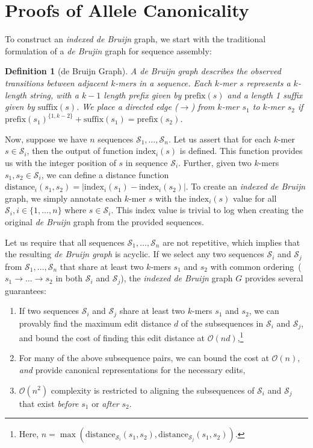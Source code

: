 \documentclass[masters]{ucbthesis}
\newtheorem{defn}{Definition}
\begin{document}
\section{Proofs of Allele Canonicality}
\label{sec:canonical-proofs}

To construct an \emph{indexed de Bruijn} graph, we start with the traditional formulation of a \emph{de
Brujin} graph for sequence assembly:

\begin{defn}[de Bruijn Graph]
\label{defn:dbg}
A de Bruijn graph describes the observed transitions between adjacent $k$-mers in a sequence. Each
$k$-mer $s$ represents a $k$-length string, with a $k - 1$ length prefix given by $\text{prefix}(s)$ and a
length 1 suffix given by $\text{suffix}(s)$. We place a directed edge ($\rightarrow$) from $k$-mer $s_1$ to
$k$-mer $s_2$ if $\text{prefix}(s_1)^{\{1, k - 2\}} + \text{suffix}(s_1) = \text{prefix}(s_2)$.
\end{defn}

Now, suppose we have $n$ sequences $\mathcal{S}_1, \dots, \mathcal{S}_n$. Let us assert that for each
$k$-mer $s \in \mathcal{S}_i$, then the output of function $\text{index}_i(s)$ is defined. This function
provides us with the integer position of $s$ in sequence $\mathcal{S}_i$. Further, given two $k$-mers
$s_1, s_2 \in \mathcal{S}_i$, we can define a distance function
$\text{distance}_i(s_1, s_2) = | \text{index}_i(s_1) - \text{index}_i(s_2) |$. To create an \emph{indexed
de Bruijn} graph, we simply annotate each $k$-mer $s$ with the $\text{index}_i(s)$ value for all
$\mathcal{S}_i, i \in \{1, \dots, n\}$ where $s \in \mathcal{S}_i$. This index value is trivial to log when
creating the original \emph{de Bruijn} graph from the provided sequences.

Let us require that all sequences $\mathcal{S}_1, \dots, \mathcal{S}_n$ are not repetitive, which implies
that the resulting \emph{de Bruijn graph} is acyclic. If we select any two sequences $\mathcal{S}_i$ and
$\mathcal{S}_j$ from $\mathcal{S}_1, \dots, \mathcal{S}_n$ that share at least two $k$-mers $s_1$ and
$s_2$ with common ordering~($s_1 \rightarrow \dots \rightarrow s_2$ in both $\mathcal{S}_i$ and
$\mathcal{S}_j$), the \emph{indexed de Bruijn} graph $G$ provides several guarantees:

\begin{enumerate}
\item If two sequences $\mathcal{S}_i$ and $\mathcal{S}_j$ share at least two $k$-mers $s_1$ and
$s_2$, we can provably find the maximum edit distance $d$ of the subsequences in $\mathcal{S}_i$ and
$\mathcal{S}_j$, and bound the cost of finding this edit distance at $\mathcal{O}(nd)$,\footnote{Here,
$n = \max(\text{distance}_{\mathcal{S}_i}(s_1, s_2), \text{distance}_{\mathcal{S}_j}(s_1, s_2))$.}
\item For many of the above subsequence pairs, we can bound the cost at $\mathcal{O}(n)$, \emph{and}
provide canonical representations for the necessary edits,
\item $\mathcal{O}(n^2)$ complexity is restricted to aligning the subsequences of $\mathcal{S}_i$ and
$\mathcal{S}_j$ that exist \emph{before} $s_1$ or \emph{after} $s_2$.
\end{enumerate}
\end{document}
